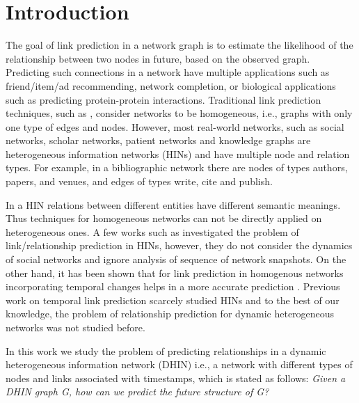 \section{Introduction}
\label{Sec:Introduction}


The goal of link prediction in a network graph \cite{liben2007link} is to estimate the likelihood of the relationship between two nodes in future, based on the observed graph. Predicting such connections in a network have multiple applications such as friend/item/ad recommending, network completion, or biological applications such as predicting protein-protein interactions. Traditional link prediction techniques, such as \cite{liben2007link}, consider networks to be homogeneous, i.e., graphs with only one type of edges and nodes. However, most real-world networks, such as social networks, scholar networks, patient networks \cite{denny2012mining} and knowledge graphs \cite{wang2015incorporating} are heterogeneous information networks (HINs) \cite{shi2017survey} and have multiple node and relation types. For example, in a bibliographic network there are nodes of types authors, papers, and venues, and edges of types write, cite and publish.%

In a HIN relations between different entities have different semantic meanings. Thus techniques for homogeneous networks can not be directly applied on heterogeneous ones. A few works such as \cite{sun2011pathsim,sun2011ASONAM} investigated the problem of link/relationship prediction in HINs, however, they do not consider the dynamics of social networks and ignore analysis of sequence of network snapshots. On the other hand, it has been shown that for link prediction in homogenous networks incorporating temporal changes helps in a more accurate prediction \cite{Zhu2016}. Previous work on temporal link prediction scarcely studied HINs and to the best of our knowledge, the problem of relationship prediction for dynamic heterogeneous networks was not studied before.

In this work we study the problem of predicting relationships in a dynamic heterogeneous information network (DHIN) i.e., a network with different types of nodes and links associated with timestamps, which is stated as follows: \textit{Given a DHIN graph G, how can we predict the future structure of G?}


